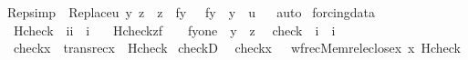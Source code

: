 \begin{isabellebody}
\endisatagproof
{\isafoldproof}%
%
\isadelimproof
\isanewline
%
\endisadelimproof
\isanewline
{}\isamarkupfalse%
\ Rep{\isacharunderscore}{\kern0pt}simp\ {\isacharcolon}{\kern0pt}\ {\isachardoublequoteopen}Replace{\isacharparenleft}{\kern0pt}u{\isacharcomma}{\kern0pt}{\isasymlambda}\ y\ z\ {\isachardot}{\kern0pt}\ z\ {\isacharequal}{\kern0pt}\ f{\isacharparenleft}{\kern0pt}y{\isacharparenright}{\kern0pt}{\isacharparenright}{\kern0pt}\ {\isacharequal}{\kern0pt}\ {\isacharbraceleft}{\kern0pt}\ f{\isacharparenleft}{\kern0pt}y{\isacharparenright}{\kern0pt}\ {\isachardot}{\kern0pt}\ y\ {\isasymin}\ u{\isacharbraceright}{\kern0pt}{\isachardoublequoteclose}\isanewline
%
\isadelimproof
\ \ %
\endisadelimproof
%
\isatagproof
{}\isamarkupfalse%
{\isacharparenleft}{\kern0pt}auto{\isacharparenright}{\kern0pt}%
\endisatagproof
{\isafoldproof}%
%
\isadelimproof
\isanewline
%
\endisadelimproof
\isanewline
{}\isamarkupfalse%
%
\isadelimdocument
%
\endisadelimdocument
%
\isatagdocument
%
\isamarkuptrue%
%
\endisatagdocument
{\isafolddocument}%
%
\isadelimdocument
%
\endisadelimdocument
{}\isamarkupfalse%
\ forcing{\isacharunderscore}{\kern0pt}data\isanewline
{}\isanewline
\isanewline
{}\isamarkupfalse%
\isanewline
\ \ Hcheck\ {\isacharcolon}{\kern0pt}{\isacharcolon}{\kern0pt}\ {\isachardoublequoteopen}{\isacharbrackleft}{\kern0pt}i{\isacharcomma}{\kern0pt}i{\isacharbrackright}{\kern0pt}\ {\isasymRightarrow}\ i{\isachardoublequoteclose}\ \isanewline
\ \ {\isachardoublequoteopen}Hcheck{\isacharparenleft}{\kern0pt}z{\isacharcomma}{\kern0pt}f{\isacharparenright}{\kern0pt}\ \ {\isasymequiv}\ {\isacharbraceleft}{\kern0pt}\ {\isasymlangle}f{\isacharbackquote}{\kern0pt}y{\isacharcomma}{\kern0pt}one{\isasymrangle}\ {\isachardot}{\kern0pt}\ y\ {\isasymin}\ z{\isacharbraceright}{\kern0pt}{\isachardoublequoteclose}\isanewline
\isanewline
{}\isamarkupfalse%
\isanewline
\ \ check\ {\isacharcolon}{\kern0pt}{\isacharcolon}{\kern0pt}\ {\isachardoublequoteopen}i\ {\isasymRightarrow}\ i{\isachardoublequoteclose}\ \isanewline
\ \ {\isachardoublequoteopen}check{\isacharparenleft}{\kern0pt}x{\isacharparenright}{\kern0pt}\ {\isasymequiv}\ transrec{\isacharparenleft}{\kern0pt}x\ {\isacharcomma}{\kern0pt}\ Hcheck{\isacharparenright}{\kern0pt}{\isachardoublequoteclose}\isanewline
\isanewline
{}\isamarkupfalse%
\ checkD{\isacharcolon}{\kern0pt}\isanewline
\ \ {\isachardoublequoteopen}check{\isacharparenleft}{\kern0pt}x{\isacharparenright}{\kern0pt}\ {\isacharequal}{\kern0pt}\ \ wfrec{\isacharparenleft}{\kern0pt}Memrel{\isacharparenleft}{\kern0pt}eclose{\isacharparenleft}{\kern0pt}{\isacharbraceleft}{\kern0pt}x{\isacharbraceright}{\kern0pt}{\isacharparenright}{\kern0pt}{\isacharparenright}{\kern0pt}{\isacharcomma}{\kern0pt}\ x{\isacharcomma}{\kern0pt}\ Hcheck{\isacharparenright}{\kern0pt}{\isachardoublequoteclose}\isanewline

\end{isabellebody}
